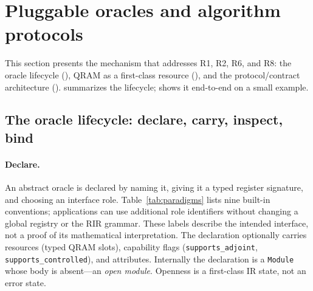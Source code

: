 \section{Pluggable oracles and algorithm protocols}
\label{sec:oracles}

This section presents the mechanism that addresses R1, R2, R6, and R8: the
oracle lifecycle (), QRAM as a first-class
resource (), and the protocol/contract architecture
().   summarizes the
lifecycle;  shows it end-to-end on a small example.

\subsection{The oracle lifecycle: declare, carry, inspect, bind}
\label{sec:oracle-lifecycle}

\paragraph{Declare.}
An abstract oracle is declared by naming it, giving it a typed register
signature, and choosing an interface role. Table~\ref{tab:paradigms}
lists nine built-in conventions; applications can use additional role
identifiers without changing a global registry or the RIR grammar.
These labels describe the intended interface, not a proof of its
mathematical interpretation.  The declaration optionally carries resources
(typed QRAM slots), capability flags (\texttt{supports\_adjoint},
\texttt{supports\_controlled}), and attributes.  Internally the declaration
is a \texttt{Module} whose body is absent---an \emph{open module}.  Openness
is a first-class IR state, not an error state.

